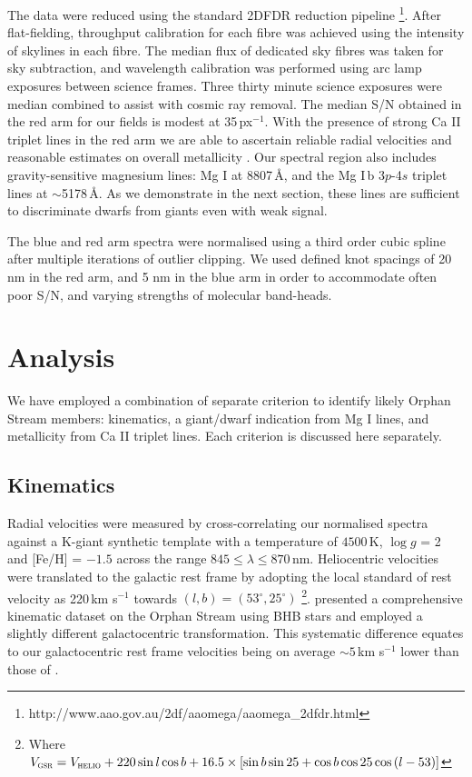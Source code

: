 \documentclass{emulateapj}
\begin{document}
The data were reduced using the standard \textsc{2DFDR} reduction pipeline \footnote{http://www.aao.gov.au/2df/aaomega/aaomega\_2dfdr.html}. After flat-fielding, throughput calibration for each fibre was achieved using the intensity of skylines in each fibre. The median flux of dedicated sky fibres was taken for sky subtraction, and wavelength calibration was performed using arc lamp exposures between science frames. Three thirty minute science exposures were median combined to assist with cosmic ray removal. The median S/N obtained in the red arm for our fields is modest at 35\,px$^{-1}$. With the presence of strong Ca \textsc{II} triplet lines in the red arm we are able to ascertain reliable radial velocities and reasonable estimates on overall metallicity \citep[][and references therein]{Starkenburg;et-al_2010}. Our spectral region also includes gravity-sensitive magnesium lines: Mg I at 8807\,{\AA}, and the Mg I\,b 3$p$-4$s$ triplet lines at $\sim$5178\,{\AA}. As we demonstrate in the next section, these lines are sufficient to discriminate dwarfs from giants even with weak signal.

The blue and red arm spectra were normalised using a third order cubic spline after multiple iterations of outlier clipping. We used defined knot spacings of 20 nm in the red arm, and 5 nm in the blue arm in order to accommodate often poor S/N, and varying strengths of molecular band-heads.

\section{Analysis}
\label{sec:analysis}

We have employed a combination of separate criterion to identify likely Orphan Stream members: kinematics, a giant/dwarf indication from Mg I lines, and metallicity from Ca II triplet lines. Each criterion is discussed here separately.

\subsection{Kinematics}
Radial velocities were measured by cross-correlating our normalised spectra against a K-giant synthetic template with a temperature of $4500$\,K, $\log{g}$ = 2 and [Fe/H] = $-1.5$ across the range $845 \leq \lambda \leq 870$\,nm. Heliocentric velocities were translated to the galactic rest frame by adopting the local standard of rest velocity as 220\,km s$^{-1}$ towards $(l, b) = (53^\circ, 25^\circ)$ \citep{Kerr;Lynden-Bell_1986, Mihalas;Binney_1981}\footnote{Where $V_{\textsc{gsr}} = V_{\textsc{helio}} + 220\sin{l}\cos{b} + 16.5\times[\sin{b}\sin{25} + \cos{b}\cos{25}\cos{(l - 53)}]$}. \citet{Newberg;et-al_2010} presented a comprehensive kinematic dataset on the Orphan Stream using BHB stars and employed a slightly different galactocentric transformation. This systematic difference equates to our galactocentric rest frame velocities being on average $\sim5$\,km s$^{-1}$ lower than those of \citet{Newberg;et-al_2010}.
\end{document}
